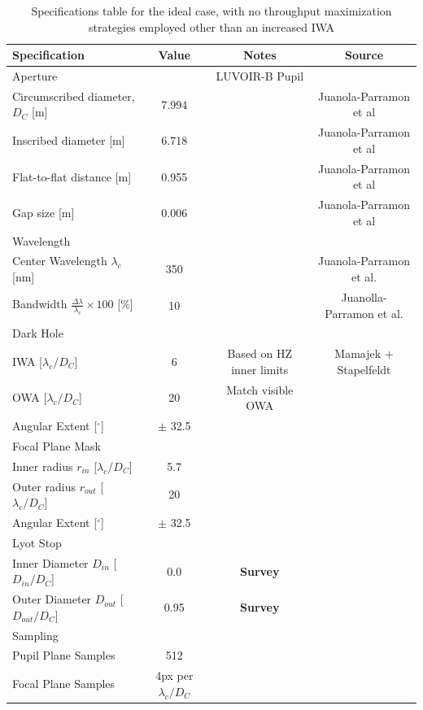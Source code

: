 \documentclass[]{spie}  %
\begin{document}
\begin{table}[H]
    \centering
    \begin{tabular}{|l|c|c|c|}
    \hline
        \textbf{Specification} & \textbf{Value} & \textbf{Notes} & \textbf{Source} \\
    \hline
        Aperture & & LUVOIR-B Pupil &  \\
    \hline
        \phantom{ooo} Circumscribed diameter, $D_C$ [m] & 7.994 & & Juanola-Parramon et al\cite{Roser_2022} \\
        \phantom{ooo} Inscribed diameter [m] & 6.718 & & Juanola-Parramon et al\cite{Roser_2022} \\
        \phantom{ooo} Flat-to-flat distance [m] & 0.955 & & Juanola-Parramon et al\cite{Roser_2022} \\
        \phantom{ooo} Gap size [m] & 0.006 & & Juanola-Parramon et al\cite{Roser_2022} \\
    \hline
        Wavelength & & & \\
    \hline
        \phantom{ooo} Center Wavelength $\lambda_c$ [nm] & 350 & & Juanola-Parramon et al.\cite{roser_uv_2026} \\
        \phantom{ooo} Bandwidth $\frac{\Delta\lambda}{\lambda_c} \times 100$ [$\%$]& 10 & & Juanolla-Parramon et al. \cite{roser_uv_2026} \\
    \hline
        Dark Hole & &  & \\
    \hline
        \phantom{ooo} IWA [$\lambda_c / D_C$] & 6 & Based on HZ inner limits & Mamajek + Stapelfeldt\cite{mamajek_nasa_nodate}\\
        \phantom{ooo} OWA [$\lambda_c / D_C$] & 20 & Match visible OWA & \\
        \phantom{ooo} Angular Extent [$^\circ$] & $\pm$ 32.5 & & \\
    \hline
        Focal Plane Mask & & & \\
    \hline
        \phantom{ooo} Inner radius $r_{in}$ [$\lambda_c / D_C$] & 5.7 & & \\
        \phantom{ooo} Outer radius $r_{out}$ [$\lambda_c / D_C$] & 20 &  & \\
        \phantom{ooo} Angular Extent [$^\circ$] & $\pm$ 32.5 & & \\
    \hline
        Lyot Stop & & & \\
    \hline
        \phantom{ooo} Inner Diameter $D_{in}$ [$D_{in} / D_C$] & 0.0 & \textbf{Survey} & \\
        \phantom{ooo} Outer Diameter $D_{out}$ [$D_{out} / D_C$] & 0.95 & \textbf{Survey} & \\
    \hline
    Sampling & & & \\
    \hline
        \phantom{ooo} Pupil Plane Samples & 512 & & \\
        \phantom{ooo} Focal Plane Samples & 4px per $\lambda_c/D_C$ & & \\
    \hline
    \end{tabular}
    \caption{Specifications table for the ideal case, with no throughput maximization strategies employed other than an increased IWA}
    \label{tab:specifications}
\end{table}
\end{document}

